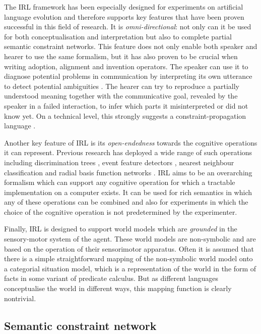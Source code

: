 The IRL framework has been especially designed for experiments on \enlargethispage{\baselineskip}
artificial language evolution and therefore supports key features that
have been proven successful in this field of research. It is
\emph{omni-directional}: not only can it be used for both
conceptualisation and interpretation but also to complete partial
semantic constraint networks. This feature does not only enable both
speaker and hearer to use the same formalism, but it has also proven
to be crucial when writing adoption, alignment and invention
operators. The speaker can use it to diagnose potential problems in
communication by interpreting its own utterance to detect potential
ambiguities \citep{steels03reentrance}. The hearer can try to
reproduce a partially understood meaning together with the
communicative goal, revealed by the speaker in a failed interaction,
to infer which parts it misinterpreted or did not know yet. On a\enlargethispage{\baselineskip}
technical level, this strongly suggests a constraint-propagation
language \citep{marriott98programming}.

Another key feature of IRL is its \emph{open-endedness} towards the
cognitive operations it can represent. Previous research has deployed
a wide range of such operations including discrimination trees
\citep{steels96perceptually}, event feature detectors
\citep{siskind01grounding}, nearest neighbour classification
\citep{belpaeme05explaining} and radial basis function networks
\citep{steels05coordinating}.  IRL aims to be an overarching formalism
which can support any cognitive operation for which a tractable
implementation on a computer exists. It can be used for rich semantics
in which any of these operations can be combined and also for
experiments in which the choice of the cognitive operation is not
predetermined by the experimenter.

Finally, IRL is designed to support world models which are
\emph{grounded} in the sensory-motor system of the agent. These world
models are non-symbolic and are based on the operation of their
sensorimotor apparatus. Often \citep[e.g.][]{batali02negotiation,
  smith03iterated, wellens08flexible} it is assumed that there is a
simple straightforward mapping of the non-symbolic world model onto a
categorial situation model, which is a representation of the world in
the form of facts in some variant of predicate calculus. But as
different languages conceptualise the world in different ways, this
mapping function is clearly nontrivial.

\subsection{Semantic constraint network}
\label{s:semantic-constraint-network}


